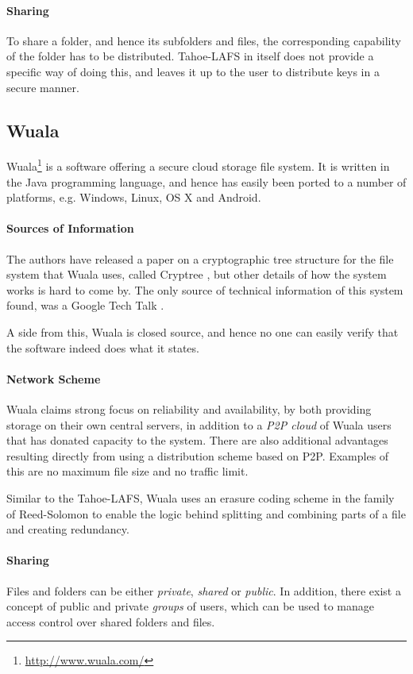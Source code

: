 \documentclass[pdftex,english,10pt,b5paper,twoside]{book}
\begin{document}
\paragraph{Sharing} To share a folder, and hence its subfolders and files, the
corresponding capability of the folder has to be distributed. Tahoe-\ac{LAFS}
in itself does not provide a specific way of doing this, and leaves it up to
the user to distribute keys in a secure manner.

\subsection{Wuala}

Wuala\footnote{\url{http://www.wuala.com/}} is a software offering a secure
cloud storage file system. It is written in the Java programming language, and
hence has easily been ported to a number of platforms, e.g. Windows, Linux, OS
X and Android.

\paragraph{Sources of Information} The authors have released a paper on a
cryptographic tree structure for the file system that Wuala uses, called
Cryptree \cite{cryptree}, but other details of how the system works is hard to
come by. The only source of technical information of this system found, was a
Google Tech Talk \cite{wuala}.

A side from this, Wuala is closed source, and hence no one can easily verify that the
software indeed does what it states.

\paragraph{Network Scheme} Wuala claims strong focus on reliability and
availability, by both providing storage on their own central servers, in
addition to a \emph{\ac{P2P} cloud} of Wuala users that has donated capacity to
the system. There are also additional advantages resulting directly from using
a distribution scheme based on \ac{P2P}.  Examples of this are no maximum file
size and no traffic limit.

Similar to the Tahoe-\ac{LAFS}, Wuala uses an erasure coding scheme in the
family of Reed-Solomon \cite{wuala} to enable the logic behind splitting and
combining parts of a file and creating redundancy.

\paragraph{Sharing} Files and folders can be either \emph{private},
\emph{shared} or \emph{public}. In addition, there exist a concept of public
and private \emph{groups} of users, which can be used to manage access control
over shared folders and files.
\end{document}
